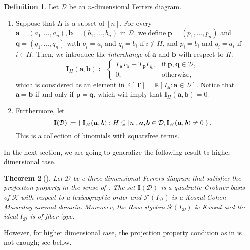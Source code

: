 \documentclass[11pt,a4paper,reqno,dvipsnames]{amsart}
\theoremstyle{plain}
\newtheorem{Theorem}{Theorem}[section]
\theoremstyle{definition}
\newtheorem{Assumptions and Discussion}[Theorem]{Assumptions and Discussion}
\newtheorem{Definition}[Theorem]{Definition}
\theoremstyle{remark}
\def\KK{{\mathbb K}}
\newcommand\bda{{\bm a}}
\newcommand\bdb{{\bm b}}
\newcommand\bdp{{\bm p}}
\newcommand\bdq{{\bm q}}
\newcommand\bdT{{\bm T}}
\newcommand\bfI{\mathbf{I}}
\newcommand\calD{\mathcal{D}}
\newcommand\calF{\mathcal{F}}
\newcommand\calK{\mathcal{K}}
\newcommand\calR{\mathcal{R}}
\begin{document}
\begin{Definition}
    \label{2-minors}
    Let $\calD$ be an $n$-dimensional Ferrers diagram.
    \begin{enumerate}[a]
        \item Suppose that $H$ is a subset of $[n]$. For every $\bda=(a_1,\ldots,a_{n}),\bdb=(b_1,\ldots,b_{n})$ in $\calD $, we define $\bdp =(p_1,\ldots,p_{n})$ and $\bdq =(q_1,\ldots,q_{n})$ with $p_i=a_i$ and $q_i=b_i$ if $i\notin H$, and $p_i=b_i$ and $q_i=a_i$ if $i\in H$. Then, we introduce the \emph{interchange} of $\bda$ and $\bdb$ with respect to $H$:
            \[
                \bfI_{H}(\bda,\bdb)\coloneqq
                \begin{cases}
                    T_{\bda}T_{\bdb}-T_{\bdp}T_{\bdq}, & \text{if
                    $\bdp, \bdq\in \calD $},\\
                    0, & \text{otherwise},
                \end{cases}
            \]
            which is considered as an element in $\KK[\bdT] =\KK[T_{\bda}:\bda\in \calD]$.  Notice that $\bda=\bdb$ if and only if $\bdp=\bdq$, which will imply that $\bfI_H(\bda,\bdb)=0$.
        \item Furthermore, let
            \[
                \bfI(\calD)\coloneqq \Set{\bfI_{H}(\bda,\bdb) : H\subseteq [n], \bda,\bdb\in \calD, \bfI_H(\bda,\bdb)\ne 0 }.
            \]
            This is a collection of binomials with squarefree terms.
    \end{enumerate}
\end{Definition}

In the next section, we are going to generalize the following result to higher dimensional case.

\begin{Theorem}
    [{\cite[Theorem 6.1 and 6.5]{Lin-Shen3D}}]
    \label{thm:3D}
    Let $\calD$ be a three-dimensional Ferrers diagram that satisfies the \emph{projection property} in the sense of \cite[Definition 2.5]{Lin-Shen3D}. The set $\bfI(\calD)$ is a quadratic Gr\"{o}bner basis of $\calK$ with respect to a lexicographic order and $\calF(I_{\calD})$ is a Koszul Cohen--Macaulay normal domain. Moreover, the Rees algebra $\calR(I_{\calD})$ is Koszul and the ideal $I_{\calD}$ is of fiber type.
\end{Theorem}

However, for higher dimensional case, the projection property condition as in  is not enough; see  below.  
\end{document}
